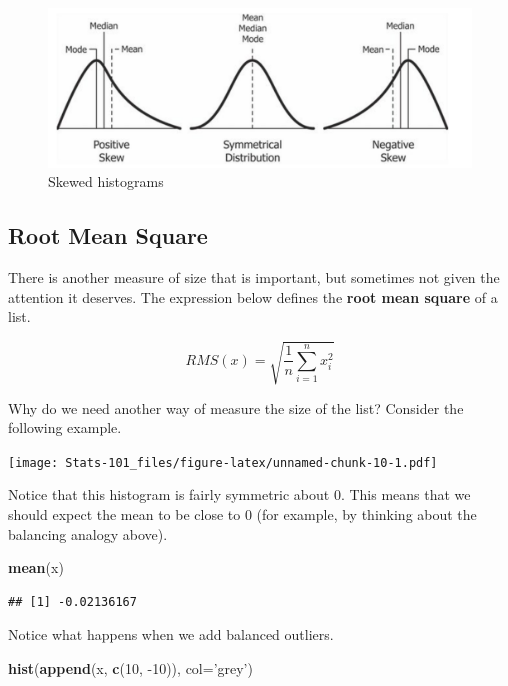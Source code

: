 \documentclass[]{book}
\newenvironment{Shaded}{\begin{snugshade}}{\end{snugshade}}
\newcommand{\DataTypeTok}[1]{\textcolor[rgb]{0.13,0.29,0.53}{#1}}
\newcommand{\DecValTok}[1]{\textcolor[rgb]{0.00,0.00,0.81}{#1}}
\newcommand{\KeywordTok}[1]{\textcolor[rgb]{0.13,0.29,0.53}{\textbf{#1}}}
\newcommand{\NormalTok}[1]{#1}
\newcommand{\StringTok}[1]{\textcolor[rgb]{0.31,0.60,0.02}{#1}}
\begin{document}
\begin{figure}
\centering
\includegraphics{hist_skew.png}
\caption{Skewed histograms}
\end{figure}

\hypertarget{root-mean-square}{%
\subsection{Root Mean Square}\label{root-mean-square}}

There is another measure of size that is important, but sometimes not given the attention it deserves. The expression below defines the \textbf{root mean square} of a list.

\[RMS(x) = \sqrt{\frac{1}{n}\sum_{i=1}^n x_i^2}\]

Why do we need another way of measure the size of the list? Consider the following example.

\texttt{[image: Stats-101\_files/figure-latex/unnamed-chunk-10-1.pdf]}

Notice that this histogram is fairly symmetric about \(0\). This means that we should expect the mean to be close to \(0\) (for example, by thinking about the balancing analogy above).

\begin{Shaded}
\begin{Highlighting}[]
\KeywordTok{mean}\NormalTok{(x)}
\end{Highlighting}
\end{Shaded}

\begin{verbatim}
## [1] -0.02136167
\end{verbatim}

Notice what happens when we add balanced outliers.

\begin{Shaded}
\begin{Highlighting}[]
\KeywordTok{hist}\NormalTok{(}\KeywordTok{append}\NormalTok{(x, }\KeywordTok{c}\NormalTok{(}\DecValTok{10}\NormalTok{, }\DecValTok{-10}\NormalTok{)), }\DataTypeTok{col=}\StringTok{'grey'}\NormalTok{)}
\end{Highlighting}
\end{Shaded}
\end{document}
